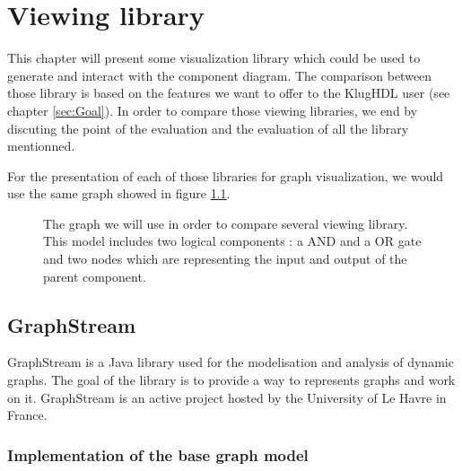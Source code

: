 \chapter{Viewing library}
\label{cha:Viewing library}

This chapter will present some visualization library which could be used to
generate and interact with the component diagram. The comparison between those
library is based on the features we want to offer to the KlugHDL user (see
chapter \ref{sec:Goal}). In order to compare those viewing libraries, we end by
discuting the point of the evaluation and the evaluation of all the library
mentionned.

For the presentation of each of those libraries for graph visualization, we would
use the same graph showed in figure \ref{fig:graph-base-model}.

\begin{figure}[H]
  \centering
  \caption[Graph model for the viewing library comparison]{The graph we will use
    in order to compare several viewing library. This model includes two
    logical components : a AND and a OR gate and two nodes which are
    representing the input and output of the parent component.}
  \label{fig:graph-base-model}
\end{figure}

\section{GraphStream}
\label{sec:GraphStream}

GraphStream is a Java library used for the modelisation and analysis of dynamic
graphs\cite{graphstream}. The goal of the library is to provide a way to
represents graphs and work on it\cite{graphstream}. GraphStream is an active
project hosted by the University of Le Havre in France.

\subsection{Implementation of the base graph model}
\label{sub:Implementation}

